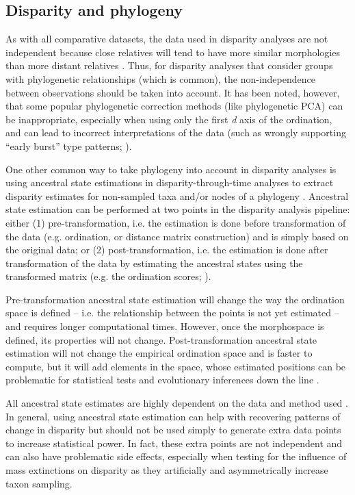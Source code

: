 \documentclass[12pt,letterpaper]{article}
\begin{document}
\subsection{Disparity and phylogeny} \label{section:phylo}

As with all comparative datasets, the data used in disparity analyses are not independent because close relatives will tend to have more similar morphologies than more distant relatives \citep{Harvey1998}.
Thus, for disparity analyses that consider groups with phylogenetic relationships (which is common), the non-independence between observations should be taken into account.
It has been noted, however, that some popular phylogenetic correction methods (like phylogenetic PCA) can be inappropriate, especially when using only the first \textit{d} axis of the ordination, and can lead to incorrect interpretations of the data (such as wrongly supporting ``early burst'' type patterns; \citealt{Uyeda2015}).

One other common way to take phylogeny into account in disparity analyses is using ancestral state estimations in disparity-through-time analyses to extract disparity estimates for non-sampled taxa and/or nodes of a phylogeny \citep{brusatte2011phylogenetic}.
Ancestral state estimation can be performed at two points in the disparity analysis pipeline: either (1) pre-transformation, i.e. the estimation is done before transformation of the data (e.g. ordination, or distance matrix construction) and is simply based on the original data; or (2) post-transformation, i.e. the estimation is done after transformation of the data by estimating the ancestral states using the transformed matrix (e.g. the ordination scores; \citealt{lloyd2018}).

Pre-transformation ancestral state estimation will change the way the ordination space is defined -- i.e.
the relationship between the points is not yet estimated -- and requires longer computational times.
However, once the morphospace is defined, its properties will not change.
Post-transformation ancestral state estimation will not change the empirical ordination space and is faster to compute, but it will add elements in the space, whose estimated positions can be problematic for statistical tests and evolutionary inferences down the line \citep{lloyd2018}.

All ancestral state estimates are highly dependent on the data and method used \cite{Louca2019}.
In general, using ancestral state estimation can help with recovering patterns of change in disparity but should not be used simply to generate extra data points to increase statistical power.
In fact, these extra points are not independent and can also have problematic side effects, especially when testing for the influence of mass extinctions on disparity as they artificially and asymmetrically increase taxon sampling.
\end{document}

